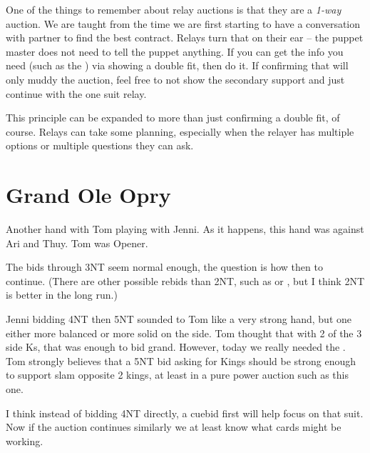 \documentclass[tom-ari]{subfile}
\begin{document}
	One of the things to remember about relay auctions is that they are a \emph{1-way} auction. We are taught from the time we are first starting to have a conversation with partner to find the best contract. Relays turn that on their ear -- the puppet master does not need to tell the puppet anything.  If you can get the info you need (such as the ) via showing a double fit, then do it.  If confirming that will only muddy the auction, feel free to not show the secondary support and just continue with the one suit relay.
	
	This principle can be expanded to more than just confirming a double fit, of course. Relays can take some planning, especially when the relayer has multiple options or multiple questions they can ask.
	
	\section{Grand Ole Opry}
	 
	
	Another hand with Tom playing with Jenni. As it happens, this hand was against Ari and Thuy. Tom was Opener.
	
	The bids through 3NT seem normal enough, the question is how then to continue.  (There are other possible rebids than 2NT, such as  or , but I think 2NT is better in the long run.)
	
	Jenni bidding 4NT then 5NT sounded to Tom like a very strong hand, but one either more balanced or more solid on the side. Tom thought that with 2 of the 3 side Ks, that was enough to bid grand.  However, today we really needed the . Tom strongly believes that a 5NT bid asking for Kings should be strong enough to support slam opposite 2 kings, at least in a pure power auction such as this one.
	
	I think instead of bidding 4NT directly, a  cuebid first will help focus on that suit.  Now if the auction continues similarly we at least know what cards might be working.




	
\end{document}

